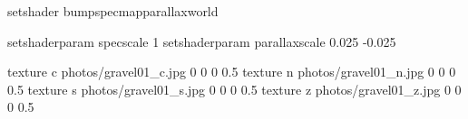 setshader bumpspecmapparallaxworld

setshaderparam specscale 1
setshaderparam parallaxscale 0.025 -0.025

texture c photos/gravel01_c.jpg 0 0 0 0.5
texture n photos/gravel01_n.jpg 0 0 0 0.5
texture s photos/gravel01_s.jpg 0 0 0 0.5
texture z photos/gravel01_z.jpg 0 0 0 0.5
